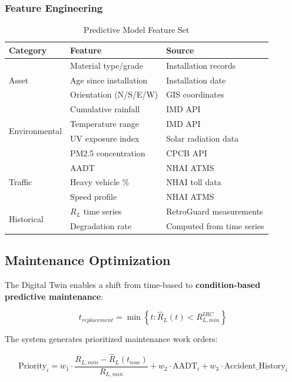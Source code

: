 \documentclass[11pt,a4paper]{article}
\begin{document}
\subsubsection{Feature Engineering}

\begin{table}[H]
\centering
\caption{Predictive Model Feature Set}
\label{tab:features}
\begin{tabular}{@{}llp{6cm}@{}}
\toprule
\textbf{Category} & \textbf{Feature} & \textbf{Source} \\
\midrule
\multirow{3}{*}{Asset} & Material type/grade & Installation records \\
 & Age since installation & Installation date \\
 & Orientation (N/S/E/W) & GIS coordinates \\
\midrule
\multirow{4}{*}{Environmental} & Cumulative rainfall & IMD API \\
 & Temperature range & IMD API \\
 & UV exposure index & Solar radiation data \\
 & PM2.5 concentration & CPCB API \\
\midrule
\multirow{3}{*}{Traffic} & AADT & NHAI ATMS \\
 & Heavy vehicle \% & NHAI toll data \\
 & Speed profile & NHAI ATMS \\
\midrule
\multirow{2}{*}{Historical} & $R_L$ time series & RetroGuard measurements \\
 & Degradation rate & Computed from time series \\
\bottomrule
\end{tabular}
\end{table}

\subsection{Maintenance Optimization}

The Digital Twin enables a shift from time-based to \textbf{condition-based predictive maintenance}:

\begin{equation}
t_{replacement} = \min\left\{t : \hat{R}_L(t) < R_{L,min}^{IRC}\right\}
\label{eq:replacement_time}
\end{equation}

The system generates prioritized maintenance work orders:

\begin{equation}
\text{Priority}_i = w_1 \cdot \frac{R_{L,min} - \hat{R}_L(t_{now})}{R_{L,min}} + w_2 \cdot \text{AADT}_i + w_3 \cdot \text{Accident\_History}_i
\label{eq:priority}
\end{equation}
\end{document}
